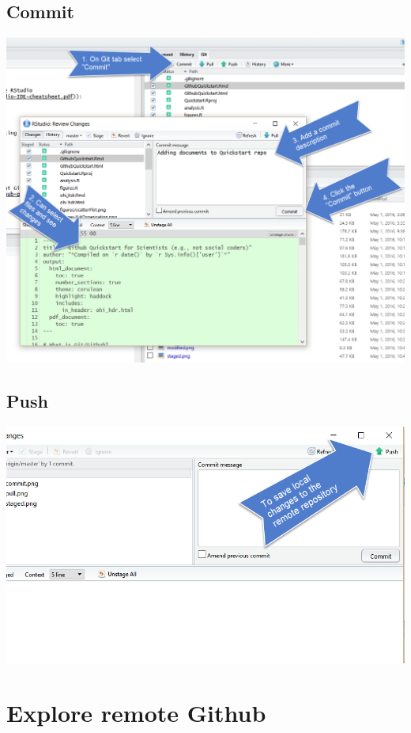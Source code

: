 \documentclass[]{book}
\begin{document}
\hypertarget{commit}{%
\subsection{Commit}\label{commit}}

\includegraphics{img/commit.png}

\hypertarget{push}{%
\subsection{Push}\label{push}}

\includegraphics{img/push.png}

\hypertarget{explore-remote-github}{%
\section{Explore remote Github}\label{explore-remote-github}}
\end{document}
